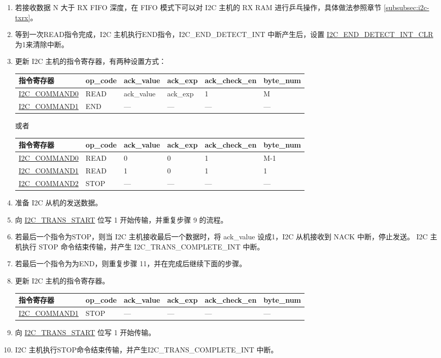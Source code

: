 \documentclass[main\_\_CN.tex]{subfiles}
\begin{document}
\begin{enumerate}
 \item 若接收数据 N 大于 RX FIFO 深度，在 FIFO 模式下可以对 I2C 主机的 RX RAM 进行乒乓操作，具体做法参照章节 \ref{subsubsec:i2c-txrx}。
\item 等到一次READ指令完成，I2C 主机执行END指令，I2C\_END\_DETECT\_INT 中断产生后，设置 \hyperref[fielddesc:I2CENDDETECTINTCLR]{I2C\_END\_DETECT\_INT\_CLR} 为1来清除中断。

\clearpage
\item 更新 I2C 主机的指令寄存器，有两种设置方式：

\begin{longtable}{ | p{4cm} | p{2cm} | p{2cm} | p{2cm} |p{2cm} | p{2cm} |}
\hline\rowcolor{lightgray}
指令寄存器& op\_code & ack\_value&ack\_exp&ack\_check\_en&byte\_num  \\ \hline
\hyperref[fielddesc:I2CCOMMAND0]{I2C\_COMMAND0} & READ& ack\_value&ack\_exp&1&M  \\ \hline
\hyperref[fielddesc:I2CCOMMAND1]{I2C\_COMMAND1} & END& ---&---&---&---  \\ \hline
\end{longtable}

或者

\begin{longtable}{ | p{4cm} | p{2cm} | p{2cm} | p{2cm} |p{2cm} | p{2cm} |}
\hline\rowcolor{lightgray}
指令寄存器& op\_code & ack\_value&ack\_exp&ack\_check\_en&byte\_num  \\ \hline
\hyperref[fielddesc:I2CCOMMAND0]{I2C\_COMMAND0} & READ& 0&0&1&M-1  \\ \hline
\hyperref[fielddesc:I2CCOMMAND1]{I2C\_COMMAND1} & READ& 1&0&1&1  \\ \hline
\hyperref[fielddesc:I2CCOMMAND2]{I2C\_COMMAND2} & STOP& ---&---&---&---  \\ \hline
\end{longtable}

\item 准备 I2C 从机的发送数据。
\item 向 \hyperref[fielddesc:I2CTRANSSTART]{I2C\_TRANS\_START} 位写 1 开始传输，并重复步骤 9 的流程。
\item 若最后一个指令为STOP，则当 I2C 主机接收最后一个数据时，将 ack\_value 设成1，I2C 从机接收到 NACK 中断，停止发送。 I2C 主机执行 STOP 命令结束传输，并产生 I2C\_TRANS\_COMPLETE\_INT 中断。
\item 若最后一个指令为为END，则重复步骤 11，并在完成后继续下面的步骤。
\item 更新 I2C 主机的指令寄存器。
\begin{longtable}{ | p{4cm} | p{2cm} | p{2cm} | p{2cm} |p{2cm} | p{2cm} |}
\hline\rowcolor{lightgray}
指令寄存器& op\_code & ack\_value&ack\_exp&ack\_check\_en&byte\_num  \\ \hline
\hyperref[fielddesc:I2CCOMMAND1]{I2C\_COMMAND1} & STOP& ---&---&---&---  \\ \hline
\end{longtable}
\item 向 \hyperref[fielddesc:I2CTRANSSTART]{I2C\_TRANS\_START} 位写 1 开始传输。
\item I2C 主机执行STOP命令结束传输，并产生I2C\_TRANS\_COMPLETE\_INT 中断。


\end{enumerate}
\end{document}
